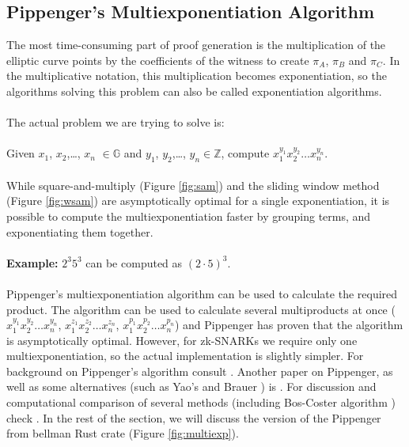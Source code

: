 \subsection{Pippenger's Multiexponentiation Algorithm}
The most time-consuming part of proof generation is the multiplication of the elliptic curve points by the coefficients of the witness to create $\pi_A$, $\pi_B$ and $\pi_C$. In the multiplicative notation, this multiplication becomes exponentiation, so the algorithms solving this problem can also be called exponentiation algorithms.\\
\\
The actual problem we are trying to solve is:\\
\\
Given $x_1$, $x_2$,\dots, $x_n$ $\in \mathbb{G}$ and $y_1$, $y_2$,\dots, $y_n \in \mathbb{Z}$, compute $x_1^{y_1} x_2^{y_2} \dots x_n^{y_n}$.\\
\\
While square-and-multiply (Figure \ref{fig:sam}) and the sliding window method (Figure \ref{fig:wsam}) are asymptotically optimal for a single exponentiation, it is possible to compute the multiexponentiation faster by grouping terms, and exponentiating them together.\\
\\
\textbf{Example:} $2^3 5^3$ can be computed as $(2 \cdot 5)^3$.\\
\\
Pippenger's multiexponentiation algorithm \cite{pippenger1976evaluation} can be used to calculate the required product. The algorithm can be used to calculate several multiproducts at once ($x_1^{y_1} x_2^{y_2} \dots x_n^{y_n}$, $x_1^{z_1} x_2^{z_2} \dots x_n^{z_n}$, $x_1^{p_1} x_2^{p_2} \dots x_n^{p_n}$) and Pippenger has proven that the algorithm is asymptotically optimal. However, for zk-SNARKs we require only one multiexponentiation, so the actual implementation is slightly simpler. For background on Pippenger's algorithm consult \cite{henry2010pippenger}. Another paper on Pippenger, as well as some alternatives (such as Yao's \cite{yao1976evaluation} and Brauer \cite{brauer1939addition}) is \cite{bernstein2002pippenger3s}. For discussion and computational comparison of several methods (including Bos-Coster algorithm \cite{bos1989addition}) check \cite{bergeron1994efficient}. In the rest of the section, we will discuss the version of the Pippenger from bellman Rust crate (Figure \ref{fig:multiexp}).
